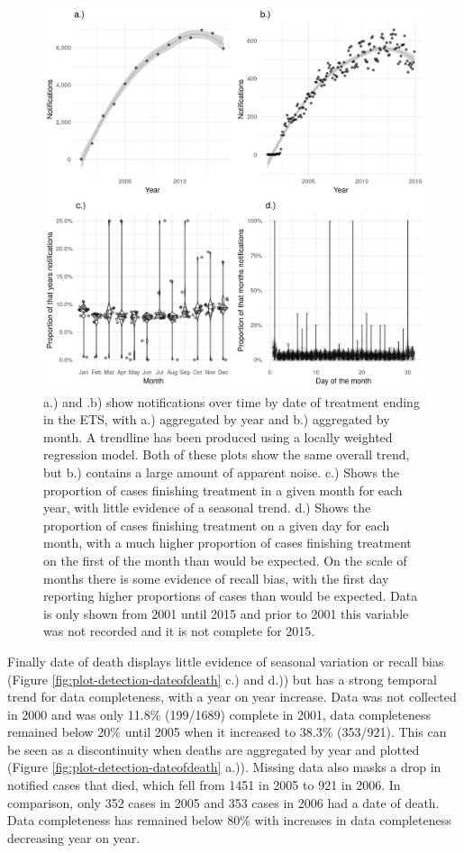 \documentclass[11pt,twoside]{bristolthesis}
\begin{document}
  \begin{figure}
  
  {\centering \includegraphics[width=0.8\linewidth]{chapters/tb-epi-england/figures/plot-detection-treatend} 
  
  }
  
  \caption{a.) and .b) show notifications over time by date of treatment ending in the ETS, with a.) aggregated by year and  b.) aggregated by month. A trendline has been produced using a locally weighted regression model. Both of these plots show the same overall trend, but b.) contains a large amount of apparent noise. c.) Shows the proportion of cases finishing treatment in a given month for each year, with little evidence of a seasonal trend. d.) Shows the proportion of cases finishing treatment on a given day for each month, with a much higher proportion of cases finishing treatment on the first of the month than would be expected. On the scale of months there is some evidence of recall bias, with the first day reporting higher proportions of cases than would be expected. Data is only shown from 2001 until 2015 and prior to 2001 this variable was not recorded and it is not complete for 2015.}\label{fig:plot-detection-treatend}
  \end{figure}
  Finally date of death displays little evidence of seasonal variation or recall bias (Figure \ref{fig:plot-detection-dateofdeath} c.) and d.)) but has a strong temporal trend for data completeness, with a year on year increase. Data was not collected in 2000 and was only 11.8\% (199/1689) complete in 2001, data completeness remained below 20\% until 2005 when it increased to 38.3\% (353/921). This can be seen as a discontinuity when deaths are aggregated by year and plotted (Figure \ref{fig:plot-detection-dateofdeath} a.)). Missing data also masks a drop in notified cases that died, which fell from 1451 in 2005 to 921 in 2006. In comparison, only 352 cases in 2005 and 353 cases in 2006 had a date of death. Data completeness has remained below 80\% with increases in data completeness decreasing year on year.
\end{document}

